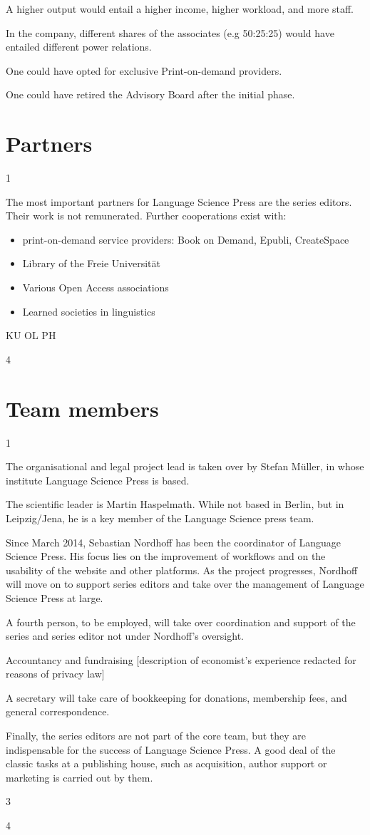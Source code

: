 \documentclass[output=guidelines,nonflat,
draftmode
]{langsci/langscibook}
\newcommand{\background}[1]{ 
  \vspace{5mm}
  \renewcommand{\tblslinecolour}{lsDarkBlue}
  \tblssy[red]{explore2}{Background}{#1}
}
\newcommand{\langscisolution}[1]{
  \renewcommand{\tblslinecolour}{lsLightBlue}
  \tblssy{langsci}{LangSci solution}{#1}
}
\newcommand{\evaluation}[1]{
  \renewcommand{\tblslinecolour}{lsLightOrange}
  \tblssy{receipt}{Evaluation}{#1}
}
\newcommand{\othersolutions}[1]{
  \renewcommand{\tblslinecolour}{lsDarkGreenOne}
  \tblssy{more}{Other solutions}{#1}
}
\renewcommand{\tblssy}[4][black!12]{%
  \renewcommand{\langscisymbol}{#2}\renewcommand{\tblsboxcolor}{#1}
  \begin{mdframed}[style=yellowexercise,frametitle={#3}]
    #4
  \end{mdframed}
}
\begin{document}
\othersolutions{A higher output would entail a higher income, higher workload, and more staff. 

In the company, different shares of the associates (e.g 50:25:25) would have entailed different power relations.

One could have opted for exclusive Print-on-demand providers. 

One could have retired the Advisory Board after the initial phase. 

}
 
\section{Partners}

\background{1}
\langscisolution{
The most important partners for Language Science Press are the series editors. Their work is not remunerated. Further cooperations exist with:
\begin{itemize}
 \item print-on-demand service providers: Book on Demand, Epubli, CreateSpace 
 \item Library of the Freie Universität 
 \item Various Open Access associations 
 \item Learned societies in linguistics
\end{itemize}
}
\evaluation{
KU
OL
PH
}
\othersolutions{4}
 

\section{Team members}

\background{1}
\langscisolution{
The organisational and legal project lead is taken over by Stefan Müller, in whose institute Language Science Press is based.

The scientific leader is Martin Haspelmath. While not based in Berlin, but in Leipzig/Jena, he is a key member of the Language Science press team.

Since March 2014, Sebastian Nordhoff has been the coordinator of Language Science Press. His focus lies on the improvement of workflows and on the usability of the website and other platforms. As the project progresses, Nordhoff will move on to support series editors and take over the management of Language Science Press at large.

A fourth person, to be employed, will take over coordination and support of the series and series editor not under Nordhoff's oversight. 

Accountancy and fundraising
[description of economist's experience redacted for reasons of  privacy law]

A secretary will take care of bookkeeping for donations, membership fees, and general correspondence.

Finally, the series editors are not part of the core team, but they are indispensable for the success of Language Science Press. A good deal of the classic tasks at a publishing house, such as acquisition, author support or marketing is carried out by them. 

}
\evaluation{3}
\othersolutions{4}
 
\end{document}
